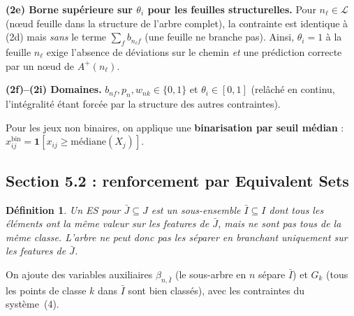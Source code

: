 \documentclass[a4paper,10pt,titlepage,leqno]{article}
\newtheorem{definition}{Définition}
\begin{document}
\begin{theorybox}
\medskip

\textbf{(2e) Borne supérieure sur $\theta_i$ pour les feuilles structurelles.} Pour $n_\ell \in \mathcal{L}$ (nœud feuille dans la structure de l'arbre complet), la contrainte est identique à (2d) mais \emph{sans} le terme $\sum_f b_{n_\ell f}$ (une feuille ne branche pas). Ainsi, $\theta_i = 1$ à la feuille $n_\ell$ exige l'absence de déviations sur le chemin \emph{et} une prédiction correcte par un nœud de $A^+(n_\ell)$.

\medskip

\textbf{(2f)--(2i) Domaines.} $b_{nf}, p_n, w_{nk} \in \{0,1\}$ et $\theta_i \in [0,1]$ (relâché en continu, l'intégralité étant forcée par la structure des autres contraintes).
\end{theorybox}

Pour les jeux non binaires, on applique une \textbf{binarisation par seuil médian} : $x_{ij}^{\text{bin}} = \mathbf{1}[x_{ij} \geq \text{médiane}(X_j)]$.

\subsection{Section 5.2 : renforcement par Equivalent Sets}

\begin{theorybox}
\begin{definition}
Un ES pour $\bar{J} \subseteq J$ est un sous-ensemble $\bar{I} \subseteq I$ dont tous les éléments ont la même valeur sur les features de $\bar{J}$, mais ne sont pas tous de la même classe. L'arbre ne peut donc pas les séparer en branchant uniquement sur les features de $\bar{J}$.
\end{definition}
\end{theorybox}

On ajoute des variables auxiliaires $\beta_{n,\bar{I}}$ (le sous-arbre en $n$ sépare $\bar{I}$) et $G_k$ (tous les points de classe $k$ dans $\bar{I}$ sont bien classés), avec les contraintes du système~(4).
\end{document}
